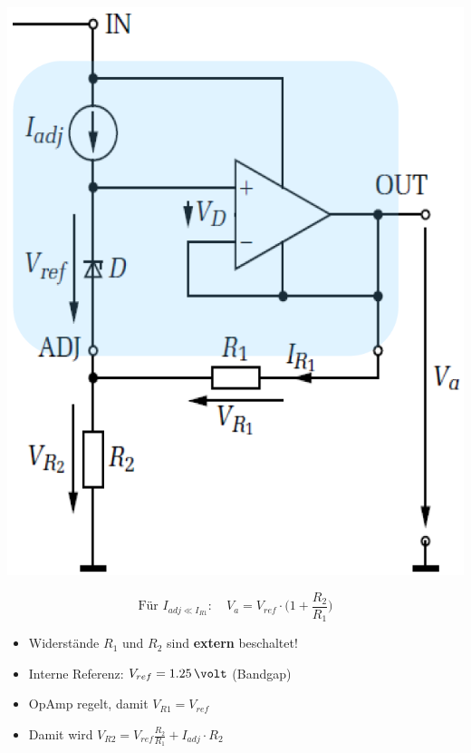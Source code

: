 \begin{minipage}[c]{0.22\columnwidth}
    \includegraphics[width=\columnwidth]{images/einstellbarer_seriespannungsregler.png}
\end{minipage}
\hfill
\begin{minipage}[c]{0.76\columnwidth}
    $$ \boxed{ \text{Für } I_{adj \ll I_{R1}}: \quad V_a = V_{ref} \cdot \Big( 1 + \frac{R_2}{R_1} \Big) }$$
    \begin{itemize}
        \item Widerstände $R_1$ und $R_2$ sind \textbf{extern} beschaltet!
        \item Interne Referenz: $V_{ref} = 1.25 \, \volt$ (Bandgap)
        \item OpAmp regelt, damit $V_{R1} = V_{ref}$
        \item Damit wird $V_{R2} = V_{ref} \frac{R_2}{R_1} + I_{adj} \cdot R_2$
    \end{itemize}
\end{minipage}
